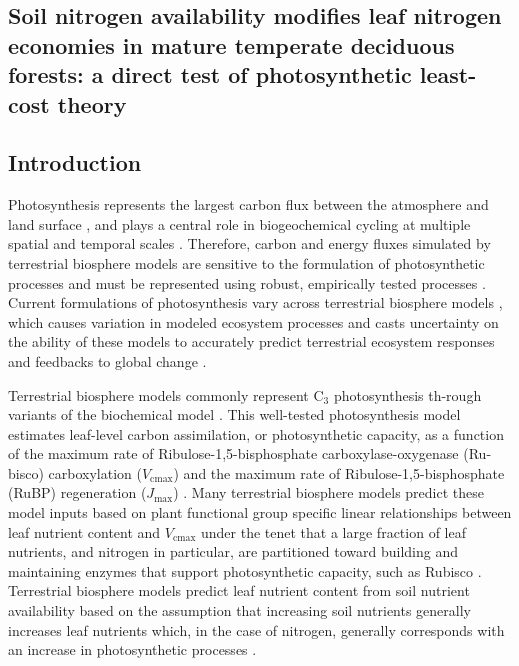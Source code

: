 \begin{singlespace}
    \chapter{\textbf{Soil nitrogen availability modifies leaf nitrogen economies in mature temperate deciduous forests: a direct test of photosynthetic least-cost theory}}
\end{singlespace}
    
\section{Introduction}
\noindent Photosynthesis represents the largest carbon flux between the atmosphere and land surface , and plays a central role in biogeochemical cycling at multiple spatial and temporal scales . Therefore, carbon and energy fluxes simulated by terrestrial biosphere models are sensitive to the formulation of photosynthetic processes  and must be represented using robust, empirically tested processes . Current formulations of photosynthesis vary across terrestrial biosphere models , which causes variation in modeled ecosystem processes  and casts uncertainty on the ability of these models to accurately predict terrestrial ecosystem responses and feedbacks to global change .

Terrestrial biosphere models commonly represent C$_{3}$ photosynthesis th-rough variants of the  biochemical model . This well-tested photosynthesis model estimates leaf-level carbon assimilation, or photosynthetic capacity, as a function of the maximum rate of Ribulose-1,5-bisphosphate carboxylase-oxygenase (Ru-bisco) carboxylation ($V_\mathrm{cmax}$) and the maximum rate of Ribulose-1,5-bisphosphate (RuBP) regeneration ($J_\mathrm{max}$) . Many terrestrial biosphere models predict these model inputs based on plant functional group specific linear relationships between leaf nutrient content and $V_\mathrm{cmax}$  under the tenet that a large fraction of leaf nutrients, and nitrogen in particular, are partitioned toward building and maintaining enzymes that support photosynthetic capacity, such as Rubisco . Terrestrial biosphere models predict leaf nutrient content from soil nutrient availability based on the assumption that increasing soil nutrients generally increases leaf nutrients  which, in the case of nitrogen, generally corresponds with an increase in photosynthetic processes .

